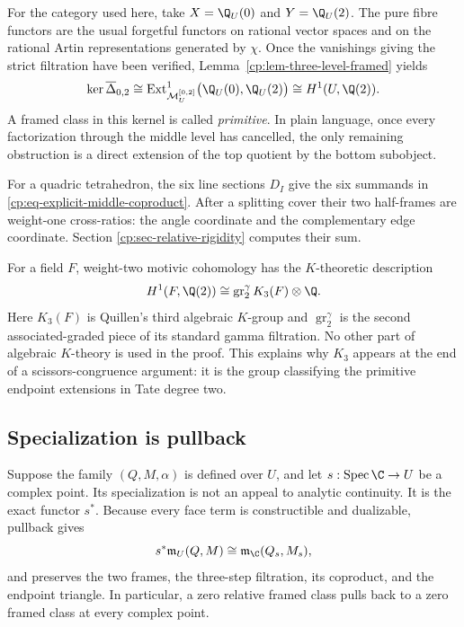 For the category used here, take \(X=\Q_U(0)\) and \(Y=\Q_U(2)\).
The pure fibre functors are the usual forgetful functors on rational vector
spaces and on the rational Artin representations generated by \(\chi\).
Once the vanishings giving the strict filtration have been verified,
Lemma~\ref{cp:lem-three-level-framed} yields
\begin{equation}
 \ker\overline\Delta_{0,2}
 \cong
 \operatorname{Ext}^1_{\mathcal M_U^{[0,2]}}
   \bigl(\Q_U(0),\Q_U(2)\bigr)
 \cong H^1(U,\Q(2)).
 \label{cp:eq-primitive-is-ext}
\end{equation}
A framed class in this kernel is called \emph{primitive}.  In plain
language, once every factorization through the middle level has cancelled,
the only remaining obstruction is a direct extension of the top quotient
by the bottom subobject.

For a quadric tetrahedron, the six line sections \(D_I\) give the six
summands in \eqref{cp:eq-explicit-middle-coproduct}.  After a splitting
cover their two half-frames are weight-one cross-ratios: the angle
coordinate and the complementary edge coordinate.  Section
\ref{cp:sec-relative-rigidity} computes their sum.

For a field \(F\), weight-two motivic cohomology has the \(K\)-theoretic
description
\begin{equation}
 H^1(F,\Q(2))
 \cong \operatorname{gr}^{\gamma}_2K_3(F)\otimes\Q.
 \label{cp:eq-weight-two-k3}
\end{equation}
Here \(K_3(F)\) is Quillen's third algebraic \(K\)-group and
\(\operatorname{gr}^{\gamma}_2\) is the second associated-graded piece of
its standard gamma filtration.  No other part of algebraic \(K\)-theory is
used in the proof.
This explains why \(K_3\) appears at the end of a scissors-congruence
argument: it is the group classifying the primitive endpoint extensions in
Tate degree two.

\subsection{Specialization is pullback}
\label{cp:subsec-specialization}

Suppose the family \((Q,M,\alpha)\) is defined over \(U\), and let
\(s:\operatorname{Spec}\C\to U\) be a complex point.  Its specialization is
not an appeal to analytic continuity.  It is the exact functor \(s^*\).
Because every face term is constructible and dualizable, pullback gives
\[
 s^*\mathfrak m_U(Q,M)
 \cong \mathfrak m_{\C}(Q_s,M_s),
\]
and preserves the two frames, the three-step filtration, its coproduct, and
the endpoint triangle.  In particular, a zero relative framed class pulls
back to a zero framed class at every complex point.

